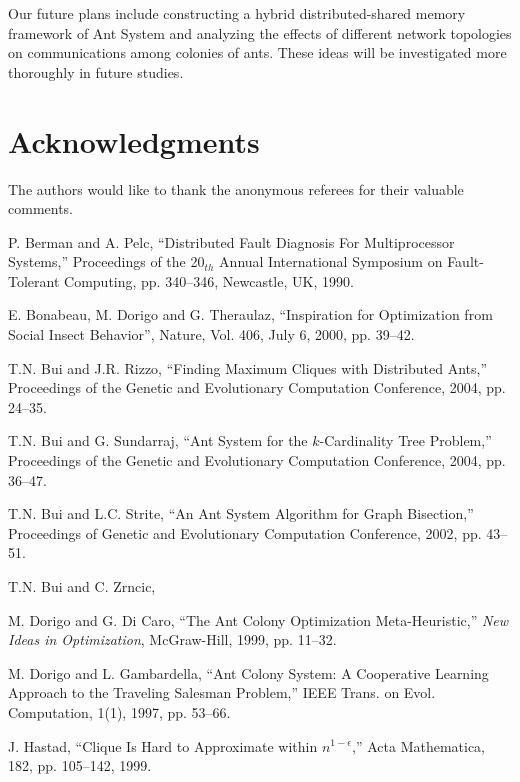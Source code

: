 \documentclass[11pt]{article}
\begin{document}
Our future plans include constructing a hybrid distributed-shared memory framework of Ant System and analyzing the effects of different network topologies on communications among colonies of ants. These ideas will be investigated more thoroughly in future studies.  

\section{Acknowledgments}

The authors would like to thank the anonymous referees for their valuable comments.


\begin{thebibliography}{99} 

P. Berman and A. Pelc, 
``Distributed Fault Diagnosis For Multiprocessor Systems,'' Proceedings of the 20$_{th}$ Annual International Symposium on Fault-Tolerant Computing, pp. 340--346, Newcastle, UK, 1990.

E. Bonabeau, M. Dorigo and G. Theraulaz,
``Inspiration for Optimization from Social Insect Behavior'',
Nature, Vol. 406, July 6, 2000, pp. 39--42.


T.N. Bui and J.R. Rizzo, ``Finding Maximum Cliques with Distributed Ants,'' Proceedings of the Genetic and Evolutionary Computation Conference, 2004, pp. 24--35.

T.N. Bui  and G. Sundarraj,  ``Ant System for the $k$-Cardinality Tree Problem,'' Proceedings of the Genetic and Evolutionary Computation Conference, 2004, pp. 36--47.


T.N. Bui and L.C. Strite, ``An Ant System Algorithm for Graph Bisection,'' Proceedings of  Genetic and Evolutionary Computation Conference, 2002, pp. 43--51.

T.N. Bui and C. Zrncic, 



M. Dorigo and G. Di Caro,
``The Ant Colony Optimization Meta-Heuristic,''
{\it New Ideas in Optimization}, McGraw-Hill, 1999, pp. 11--32.


M. Dorigo and L. Gambardella,
``Ant Colony System: A Cooperative Learning Approach to the Traveling
Salesman Problem,''
IEEE Trans. on Evol. Computation, 1(1), 1997, pp. 53--66.


J. Hastad, ``Clique Is Hard to Approximate within $n^{1 - \epsilon}$,'' Acta Mathematica, 182, pp. 105--142, 1999.


\end{thebibliography}
\end{document}
